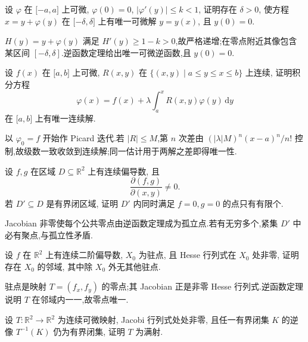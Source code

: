 \begin{example}
    设 $\varphi$ 在 $\lbrack-a,a\rbrack$ 上可微, $\varphi(0)=0$, $|\varphi'(y)|\leq k<1$, 证明存在 $\delta>0$, 使方程 $x=y+\varphi(y)$ 在 $\lbrack-\delta,\delta\rbrack$ 上有唯一可微解 $y=y(x)$, 且 $y(0)=0$.
\end{example}
\exampleblank

\begin{solution}
    $H(y)=y+\varphi(y)$ 满足 $H'(y)\geq1-k>0$,故严格递增;在零点附近其像包含某区间 $[-\delta,\delta]$.逆函数定理给出唯一可微逆函数,且 $y(0)=0$.
\end{solution}

\begin{example}
    设 $f(x)$ 在 $\lbrack a,b\rbrack$ 上可微, $R(x,y)$ 在 $\{(x,y)\mid a\leq y\leq x\leq b\}$ 上连续, 证明积分方程
    \[
        \varphi(x)=f(x)+\lambda\int_a^xR(x,y)\varphi(y)\,\mathrm{d}y
    \]
    在 $\lbrack a,b\rbrack$ 上有唯一连续解.
\end{example}
\exampleblank

\begin{solution}
    以 $\varphi_0=f$ 开始作 Picard 迭代.若 $|R|\leq M$,第 $n$ 次差由 $(|\lambda|M)^n(x-a)^n/n!$ 控制,故级数一致收敛到连续解;同一估计用于两解之差即得唯一性.
\end{solution}

\begin{example}
    设 $f,g$ 在区域 $D\subseteq\mathbb{R}^2$ 上有连续偏导数, 且
    \[
        \dfrac{\partial(f,g)}{\partial(x,y)}\ne0.
    \]
    若 $D'\subseteq D$ 是有界闭区域, 证明 $D'$ 内同时满足 $f=0,g=0$ 的点只有有限个.
\end{example}
\exampleblank

\begin{solution}
    Jacobian 非零使每个公共零点由逆函数定理成为孤立点.若有无穷多个,紧集 $D'$ 中必有聚点,与孤立性矛盾.
\end{solution}

\begin{example}
    设 $f$ 在 $\mathbb{R}^2$ 上有连续二阶偏导数, $X_0$ 为驻点, 且 Hesse 行列式在 $X_0$ 处非零, 证明存在 $X_0$ 的邻域, 其中除 $X_0$ 外无其他驻点.
\end{example}
\exampleblank

\begin{solution}
    驻点是映射 $T=(f_x,f_y)$ 的零点;其 Jacobian 正是非零 Hesse 行列式.逆函数定理说明 $T$ 在邻域内一一,故零点唯一.
\end{solution}

\begin{example}
    设 $T:\mathbb{R}^2\to\mathbb{R}^2$ 为连续可微映射, Jacobi 行列式处处非零, 且任一有界闭集 $K$ 的逆像 $T^{-1}(K)$ 仍为有界闭集, 证明 $T$ 为满射.
\end{example}
\exampleblank


